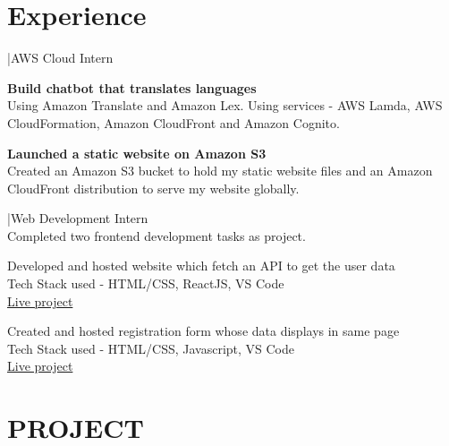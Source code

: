 \documentclass[letterpaper]{deedy-resume} %
\begin{document}
\begin{minipage}[t]{0.66\textwidth} %


\section{Experience}

 |{AWS Cloud Intern}\\
\vspace{\topsep}
\begin{tightitemize}
\item \textbf{Build chatbot that translates languages}\\
Using Amazon Translate and Amazon Lex. Using services - AWS Lamda, AWS CloudFormation, Amazon CloudFront and Amazon Cognito.
\item \textbf{Launched a static website on Amazon S3}\\
Created an Amazon S3 bucket to hold my static website files and an Amazon CloudFront
distribution to serve my website globally.
\end{tightitemize}
\sectionspace

 |{Web Development Intern}\\
Completed two frontend development tasks as project.
\begin{tightitemize}
\item Developed and hosted website which fetch an API to get the user data\\
Tech Stack used - HTML/CSS, ReactJS, VS Code\\
{\href{https://u20qz.csb.app//}{Live project}}
\item Created and hosted registration form whose data displays in same page\\
Tech Stack used - HTML/CSS, Javascript, VS Code\\
{\href{https://quizzical-shockley-fcef48.netlify.app/}{Live project}}
\end{tightitemize}

\sectionspace

\section{PROJECT}



\end{minipage}
\end{document}
